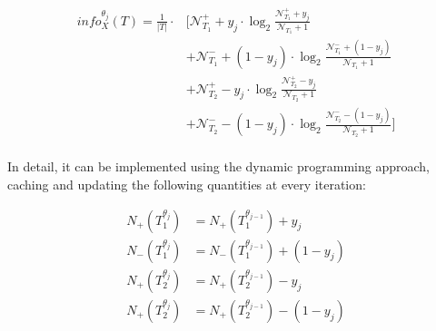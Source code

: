 \documentclass[12pt]{article}
\begin{document}

\begin{equation*}
    \begin{aligned}
        info_X^{\theta_{j}}(T) = \frac{1}{|T|} \cdot & \Biggl[\mathcal{N}_{T_1}^+ + y_j \cdot \log_2{\frac{\mathcal{N}_{T_1}^+ + y_j}{\mathcal{N}_{T_1} + 1}}\\
        & + \mathcal{N}_{T_1}^- + (1 - y_j) \cdot \log_2{\frac{\mathcal{N}_{T_1}^- + (1 - y_j)}{\mathcal{N}_{T_1} + 1}} \\
        & + \mathcal{N}_{T_2}^+ - y_j \cdot \log_2{\frac{\mathcal{N}_{T_2}^+ - y_j}{\mathcal{N}_{T_2} + 1}}\\
        & + \mathcal{N}_{T_2}^- - (1 - y_j) \cdot \log_2{\frac{\mathcal{N}_{T_2}^- - (1 - y_j)}{\mathcal{N}_{T_2} + 1}}\Biggr] \\
    \end{aligned}
\end{equation*}

In detail, it can be implemented using the dynamic programming approach, caching and updating the following quantities at every iteration:



\begin{equation*}
    \begin{aligned}
        N_+(T_1^{\theta_{j}}) & = N_+(T_1^{\theta_{j-1}}) + y_j \\
        N_-(T_1^{\theta_{j}}) & = N_-(T_1^{\theta_{j-1}}) + (1 - y_j) \\ 
        N_+(T_2^{\theta_{j}}) & = N_+(T_2^{\theta_{j-1}}) - y_j \\
        N_+(T_2^{\theta_{j}}) & = N_+(T_2^{\theta_{j-1}}) - (1 - y_j) \\
    \end{aligned}
\end{equation*}


\end{document}
